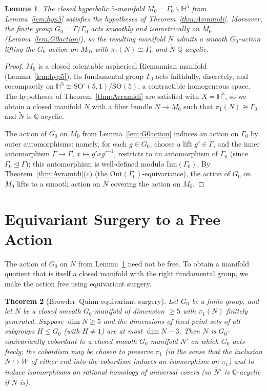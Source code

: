 \documentclass[12pt]{article}
\newtheorem{theorem}{Theorem}
\newtheorem{lemma}[theorem]{Lemma}
\theoremstyle{definition}
\begin{document}
\begin{lemma}\label{lem:avramidi-applied}
The closed hyperbolic $5$-manifold $M_0=\Gamma_0\backslash\mathbb{H}^5$ from Lemma~\ref{lem:hyp5} satisfies the hypotheses of Theorem~\ref{thm:Avramidi}. Moreover, the finite group $G_0=\Gamma/\Gamma_0$ acts smoothly and isometrically on $M_0$ (Lemma~\ref{lem:G0action}), so the resulting manifold $N$ admits a smooth $G_0$-action lifting the $G_0$-action on $M_0$, with $\pi_1(N)\cong\Gamma_0$ and $\widetilde{N}$ $\mathbb{Q}$-acyclic.
\end{lemma}

\begin{proof}
$M_0$ is a closed orientable aspherical Riemannian manifold (Lemma~\ref{lem:hyp5}). Its fundamental group $\Gamma_0$ acts faithfully, discretely, and cocompactly on $\mathbb{H}^5\cong\mathrm{SO}^\circ(5,1)/\mathrm{SO}(5)$, a contractible homogeneous space. The hypotheses of Theorem~\ref{thm:Avramidi} are satisfied with $X=\mathbb{H}^5$, so we obtain a closed manifold $N$ with a fiber bundle $N\to M_0$ such that $\pi_1(N)\cong\Gamma_0$ and $\widetilde{N}$ is $\mathbb{Q}$-acyclic.

The action of $G_0$ on $M_0$ from Lemma~\ref{lem:G0action} induces an action on $\Gamma_0$ by outer automorphisms: namely, for each $g\in G_0$, choose a lift $g'\in\Gamma$, and the inner automorphism $\Gamma\to\Gamma$, $x\mapsto g'xg'^{-1}$, restricts to an automorphism of $\Gamma_0$ (since $\Gamma_0\trianglelefteq\Gamma$); this automorphism is well-defined modulo $\mathrm{Inn}(\Gamma_0)$. By Theorem~\ref{thm:Avramidi}(c) (the $\mathrm{Out}(\Gamma_0)$-equivariance), the action of $G_0$ on $M_0$ lifts to a smooth action on $N$ covering the action on $M_0$.
\end{proof}

\section{Equivariant Surgery to a Free Action}\label{sec:surgery}

The action of $G_0$ on $N$ from Lemma~\ref{lem:avramidi-applied} need not be free. To obtain a manifold quotient that is itself a closed manifold with the right fundamental group, we make the action free using equivariant surgery.

\begin{theorem}[Browder--Quinn equivariant surgery]\label{thm:BQ}
Let $G_0$ be a finite group, and let $N$ be a closed smooth $G_0$-manifold of dimension $\geq 5$ with $\pi_1(N)$ finitely generated. Suppose $\dim N\geq 5$ and the dimensions of fixed-point sets of all subgroups $H\leq G_0$ (with $H\neq 1$) are at most $\dim N - 3$. Then $N$ is $G_0$-equivariantly cobordant to a closed smooth $G_0$-manifold $N'$ on which $G_0$ acts freely; the cobordism may be chosen to preserve $\pi_1$ (in the sense that the inclusion $N\hookrightarrow W$ of either end into the cobordism induces an isomorphism on $\pi_1$) and to induce isomorphisms on rational homology of universal covers (so $\widetilde{N'}$ is $\mathbb{Q}$-acyclic if $\widetilde{N}$ is).
\end{theorem}
\end{document}

